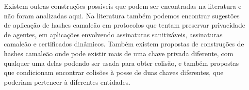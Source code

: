 \documentclass[a4paper]{article}
\begin{document}
Existem outras construções possíveis que podem ser encontradas na
literatura e não foram analizadas aqui. Na literatura também podemos
encontrar sugestões de aplicação de hashes camaleão em protocolos que
tentam preservar privacidade de agentes, em aplicações envolvendo
assinaturas sanitizáveis, assinaturas camaleão e certificados
dinâmicos. Também existem propostas de construções de hashes camaleão
onde pode existir mais de uma chave privada diferente, com qualquer
uma delas podendo ser usada para obter colisão, e também propostas que
condicionam encontrar colisões à posse de duas chaves diferentes, que
poderiam pertencer à diferentes entidades.

{}
\end{document}
